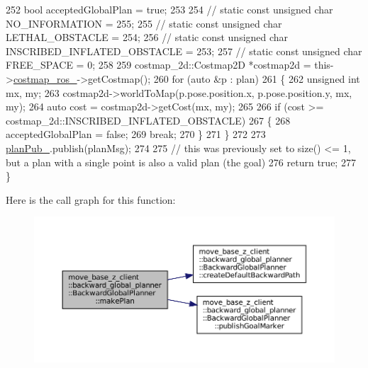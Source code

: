\begin{DoxyCode}
252     \textcolor{keywordtype}{bool} acceptedGlobalPlan = \textcolor{keyword}{true};
253 
254     \textcolor{comment}{// static const unsigned char NO\_INFORMATION = 255;}
255     \textcolor{comment}{// static const unsigned char LETHAL\_OBSTACLE = 254;}
256     \textcolor{comment}{// static const unsigned char INSCRIBED\_INFLATED\_OBSTACLE = 253;}
257     \textcolor{comment}{// static const unsigned char FREE\_SPACE = 0;}
258 
259     costmap\_2d::Costmap2D *costmap2d = this->\hyperlink{classmove__base__z__client_1_1backward__global__planner_1_1BackwardGlobalPlanner_ae8c01babf5da5df079840246c34ef1ea}{costmap\_ros\_}->getCostmap();
260     \textcolor{keywordflow}{for} (\textcolor{keyword}{auto} &p : plan)
261     \{
262         \textcolor{keywordtype}{unsigned} \textcolor{keywordtype}{int} mx, my;
263         costmap2d->worldToMap(p.pose.position.x, p.pose.position.y, mx, my);
264         \textcolor{keyword}{auto} cost = costmap2d->getCost(mx, my);
265 
266         \textcolor{keywordflow}{if} (cost >= costmap\_2d::INSCRIBED\_INFLATED\_OBSTACLE)
267         \{
268             acceptedGlobalPlan = \textcolor{keyword}{false};
269             \textcolor{keywordflow}{break};
270         \}
271     \}
272     
273     \hyperlink{classmove__base__z__client_1_1backward__global__planner_1_1BackwardGlobalPlanner_ab074d9ac8ea790d7f5275ee27dae940c}{planPub\_}.publish(planMsg);
274 
275     \textcolor{comment}{// this was previously set to size() <= 1, but a plan with a single point is also a valid plan (the
       goal)}
276     \textcolor{keywordflow}{return} \textcolor{keyword}{true};
277 \}
\end{DoxyCode}
Here is the call graph for this function\+:
\nopagebreak
\begin{figure}[H]
\begin{center}
\leavevmode
\includegraphics[width=350pt]{classmove__base__z__client_1_1backward__global__planner_1_1BackwardGlobalPlanner_af9441c1bd8d258281458ca7fa012e0e6_cgraph}
\end{center}
\end{figure}
